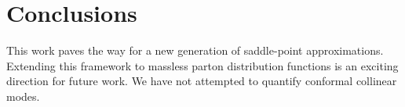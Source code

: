 \section{Conclusions}\label{sec:conclusions}

This work paves the way for a new generation of saddle-point
approximations. Extending this framework to massless parton distribution
functions is an exciting direction for future work. We have not
attempted to quantify conformal collinear modes.

